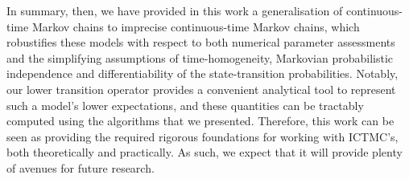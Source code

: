 \documentclass[10pt,a4paper]{paper}
\theoremstyle{definition}
\newcommand{\processes}{\mathbb{P}}
\newcommand{\wprocesses}{\processes^{\mathrm{W}}}
\newcommand{\rateset}{\mathcal{Q}}
\newcommand{\lrate}{\underline{Q}}
\newcommand{\ictmc}{{ICTMC}}
\begin{document}

In summary, then, we have provided in this work a generalisation of continuous-time Markov chains to imprecise continuous-time Markov chains, which robustifies these models with respect to both numerical parameter assessments and the simplifying assumptions of time-homogeneity, Markovian probabilistic independence and differentiability of the state-transition probabilities. Notably, our lower transition operator provides a convenient analytical tool to represent such a model's lower expectations, and these quantities can be tractably computed using the algorithms that we presented. Therefore, this work can be seen as providing the required rigorous foundations for working with \ictmc's, both theoretically and practically. As such, we expect that it will provide plenty of avenues for future research. 

\end{document}
